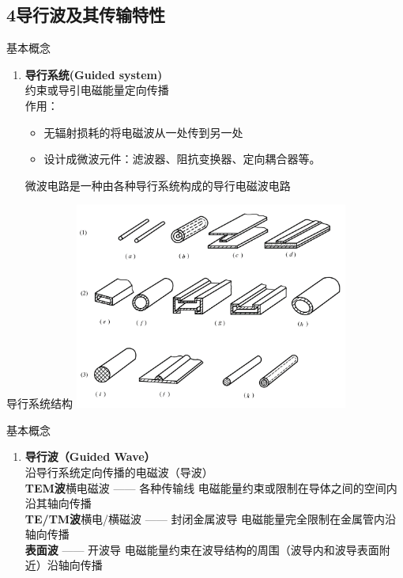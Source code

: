 \subsection{4\quad 导行波及其传输特性}
\begin{frame}{基本概念}
 \begin{enumerate}
  \item \textbf{导行系统(Guided system)}
        \saveenum
        \\约束或导引电磁能量定向传播\\
        作用：\\
        \begin{itemize}
         \item 无辐射损耗的将电磁波从一处传到另一处
         \item 设计成微波元件：滤波器、阻抗变换器、定向耦合器等。
        \end{itemize}
        微波电路是一种由各种导行系统构成的导行电磁波电路
 \end{enumerate}

\end{frame}

\begin{frame}{导行系统结构}
 \centering
 \includegraphics[width=9cm]{guidesystem.png}
\end{frame}

\begin{frame}{基本概念}
 \begin{enumerate}
  \resume
  \item \textbf{导行波（Guided Wave）}
        \\沿导行系统定向传播的电磁波（导波）
        \\\textbf{TEM波}\quad 横电磁波 —— 各种传输线 电磁能量约束或限制在导体之间的空间内沿其轴向传播
        \\\textbf{TE/TM波}\quad 横电/横磁波 —— 封闭金属波导 电磁能量完全限制在金属管内沿轴向传播
        \\\textbf{表面波} —— 开波导 电磁能量约束在波导结构的周围（波导内和波导表面附近）沿轴向传播
        \saveenum
 \end{enumerate}
\end{frame}

